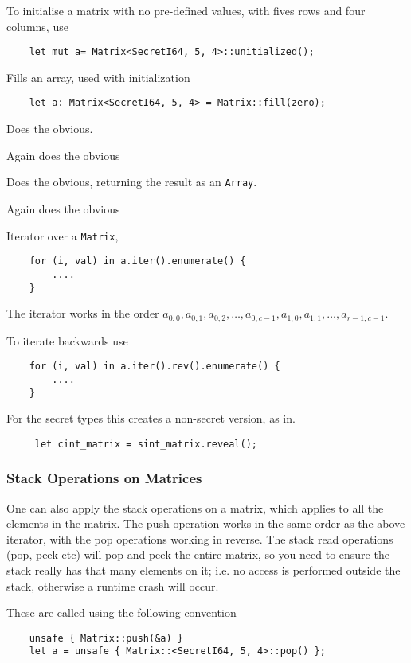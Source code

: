 To initialise a matrix with no pre-defined values, with
fives rows and four columns, use
\begin{lstlisting}
    let mut a= Matrix<SecretI64, 5, 4>::unitialized();
\end{lstlisting}


Fills an array, used with initialization
\begin{lstlisting}
    let a: Matrix<SecretI64, 5, 4> = Matrix::fill(zero);
\end{lstlisting}


Does the obvious.

Again does the obvious

Does the obvious, returning the result as an \verb|Array|.

Again does the obvious


Iterator over a \verb|Matrix|,
\begin{lstlisting}
    for (i, val) in a.iter().enumerate() {
        ....
    }
\end{lstlisting}
The iterator works in the order
$a_{0,0}, a_{0,1}, a_{0,2}, \ldots, a_{0,c-1}, a_{1,0}, a_{1,1}, \ldots, a_{r-1,c-1}$.

\noindent
To iterate backwards use
\begin{lstlisting}
    for (i, val) in a.iter().rev().enumerate() {
        ....
    }
\end{lstlisting}

For the secret types this creates a non-secret version, as in.
\begin{lstlisting}
     let cint_matrix = sint_matrix.reveal();
\end{lstlisting}

\subsubsection{Stack Operations on Matrices}
One can also apply the stack operations on a matrix, which
applies to all the elements in the matrix.
The push operation works in the same order as the above
iterator, with the pop operations working in reverse.
The stack read operations (pop, peek etc) will pop and peek
the entire matrix, so you need to ensure the stack really has
that many elements on it; i.e. no access is performed outside
the stack, otherwise a runtime crash will occur.

These are called using the following convention
\begin{lstlisting}
    unsafe { Matrix::push(&a) }
    let a = unsafe { Matrix::<SecretI64, 5, 4>::pop() };
\end{lstlisting}

